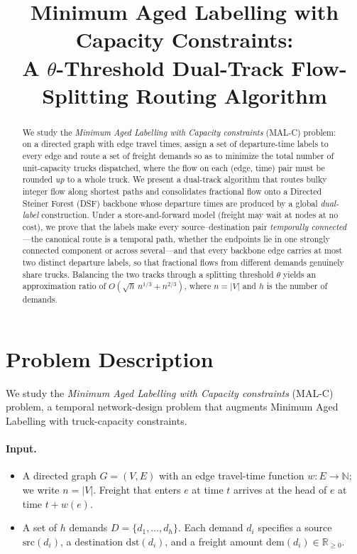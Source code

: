 \documentclass[11pt]{article}
\title{\bf Minimum Aged Labelling with Capacity Constraints:\\[2pt]
A $\theta$-Threshold Dual-Track Flow-Splitting Routing Algorithm }
\author{}
\date{}
\theoremstyle{definition}
\theoremstyle{remark}
\newcommand{\src}{\mathrm{src}}
\newcommand{\dst}{\mathrm{dst}}
\newcommand{\dem}{\mathrm{dem}}
\begin{document}
\maketitle

\begin{abstract}
We study the \emph{Minimum Aged Labelling with Capacity constraints} (MAL-C) problem: on a directed
graph with edge travel times, assign a set of departure-time labels to every edge and route a set of
freight demands so as to minimize the total number of unit-capacity trucks dispatched, where the flow
on each (edge, time) pair must be rounded \emph{up} to a whole truck. We present a dual-track algorithm
that routes bulky integer flow along shortest paths and consolidates fractional flow onto a Directed
Steiner Forest (DSF) backbone whose departure times are produced by a global \emph{dual-label}
construction. Under a store-and-forward model (freight may wait at nodes at no cost), we prove that the
labels make every source--destination pair \emph{temporally connected}---the canonical route is a
temporal path, whether the endpoints lie in one strongly connected component or across several---and
that every backbone edge carries at most two distinct departure labels, so that fractional flows from
different demands genuinely share trucks. Balancing the two tracks through a splitting threshold
$\theta$ yields an approximation ratio of $O\!\left(\sqrt{h}\,n^{1/3} + n^{2/3}\right)$, where $n=|V|$
and $h$ is the number of demands.
\end{abstract}

\section{Problem Description}

We study the \emph{Minimum Aged Labelling with Capacity constraints} (MAL-C) problem, a temporal
network-design problem that augments Minimum Aged Labelling with truck-capacity constraints. 

\paragraph{Input.}
\begin{itemize}[topsep=2pt,itemsep=1pt]
  \item A directed graph $G=(V,E)$ with an edge travel-time function $w:E\to\mathbb{N}$; we write
        $n=|V|$. Freight that enters $e$ at time $t$ arrives at the head of $e$ at time $t+w(e)$.
  \item A set of $h$ demands $D=\{d_1,\dots,d_h\}$. Each demand $d_i$ specifies a source
        $\src(d_i)$, a destination $\dst(d_i)$, and a freight amount $\dem(d_i)\in\mathbb{R}_{\ge 0}$.
\end{itemize}
\end{document}
